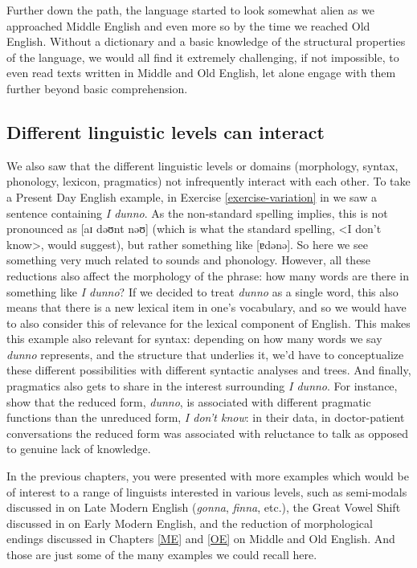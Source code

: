 Further down the path, the language started to look somewhat alien as we approached Middle English and even more so by the time we reached Old English. Without a dictionary and a basic knowledge of the structural properties of the language, we would all find it extremely challenging, if not impossible, to even read texts written in Middle and Old English, let alone engage with them further beyond basic comprehension.

\subsection{Different linguistic levels can interact}
We also saw that the different linguistic levels or domains (morphology, syntax, phonology, lexicon, pragmatics) not infrequently interact with each other. To take a Present Day English example, in Exercise \ref{exercise-variation} in  we saw a sentence containing \textit{I dunno}. As the non-standard spelling implies, this is not pronounced as [aɪ dəʊnt nəʊ] (which is what the standard spelling, <I don't know>, would suggest), but rather something like [ɐdənə]. So here we see something very much related to sounds and phonology. However, all these reductions also affect the morphology of the phrase: how many words are there in something like \textit{I dunno}? If we decided to treat \textit{dunno} as a single word, this also means that there is a new lexical item in one's vocabulary, and so we would have to also consider this of relevance for the lexical component of English. This makes this example also relevant for syntax: depending on how many words we say \textit{dunno} represents, and the structure that underlies it, we'd have to conceptualize these different possibilities with different syntactic analyses and trees. And finally, pragmatics also gets to share in the interest surrounding \textit{I dunno}. For instance, \citet{PichlerLevey2010} show that the reduced form, \textit{dunno}, is associated with different pragmatic functions than the unreduced form, \textit{I don't know}: in their data, in doctor-patient conversations the reduced form was associated with reluctance to talk as opposed to genuine lack of knowledge.

In the previous chapters, you were presented with more examples which would be of interest to a range of linguists interested in various levels, such as semi-modals discussed in  on Late Modern English (\textit{gonna}, \textit{finna}, etc.), the Great Vowel Shift discussed in  on Early Modern English, and the reduction of morphological endings discussed in Chapters \ref{ME} and \ref{OE} on Middle and Old English. And those are just some of the many examples we could recall here.

